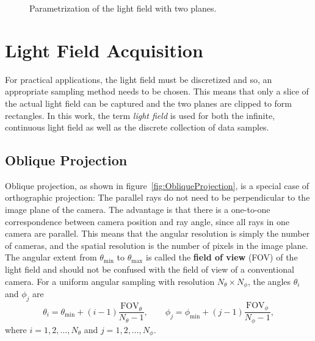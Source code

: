 \begin{figure}
	\centering
	
	\caption[Parametrization of the light field with two planes]
			{Parametrization of the light field with two planes.}
	\label{fig:LightFieldParametrization}
\end{figure}

\section{Light Field Acquisition}
\label{sec:light_field_aquisition}

For practical applications, the light field must be discretized and so, an appropriate sampling method needs to be chosen.
This means that only a slice of the actual light field can be captured and the two planes are clipped to form rectangles.
In this work, the term \emph{light field} is used for both the infinite, continuous light field as well as the discrete collection of data samples.

\subsection*{Oblique Projection}

Oblique projection, as shown in figure~\ref{fig:ObliqueProjection}, is a special case of orthographic projection: The parallel rays do not need to be perpendicular to the image plane of the camera.
The advantage is that there is a one-to-one correspondence between camera position and ray angle, since all rays in one camera are parallel.
This means that the angular resolution is simply the number of cameras, and the spatial resolution is the number of pixels in the image plane.
The angular extent from $\theta_\text{min}$ to $\theta_\text{max}$ is called the \textbf{field of view} (FOV) of the light field and should not be confused with the field of view of a conventional camera.
For a uniform angular sampling with resolution $N_\theta \times N_\phi$, the angles $\theta_i$ and $\phi_j$ are
\begin{equation}
	\theta_i = \theta_\text{min} + (i - 1) \frac{\text{FOV}_\theta}{N_\theta - 1}, 
	\qquad 
	\phi_j 	 = \phi_\text{min} + (j - 1) \frac{\text{FOV}_\phi}{N_\phi - 1},
\end{equation}
where $i = 1, 2, \dots, N_\theta$ and $j = 1, 2, \dots, N_\phi$.

